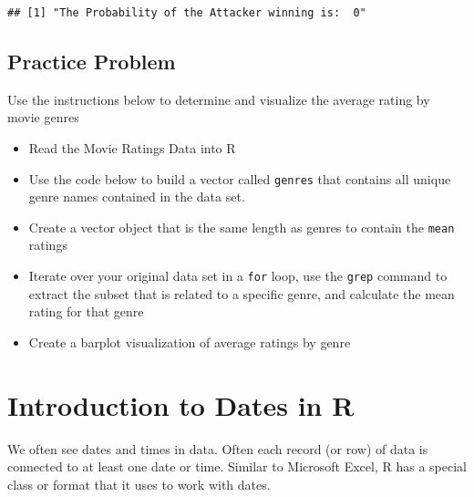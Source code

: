 \documentclass[]{book}
\newenvironment{Shaded}{\begin{snugshade}}{\end{snugshade}}
\newcommand{\KeywordTok}[1]{\textcolor[rgb]{0.13,0.29,0.53}{\textbf{{#1}}}}
\newcommand{\CharTok}[1]{\textcolor[rgb]{0.31,0.60,0.02}{{#1}}}
\newcommand{\StringTok}[1]{\textcolor[rgb]{0.31,0.60,0.02}{{#1}}}
\newcommand{\NormalTok}[1]{{#1}}
\providecommand{\tightlist}{%
  \setlength{\itemsep}{0pt}\setlength{\parskip}{0pt}}
\begin{document}
\begin{verbatim}
## [1] "The Probability of the Attacker winning is:  0"
\end{verbatim}

\section{Practice Problem}\label{practice-problem-3}

Use the instructions below to determine and visualize the average rating
by movie genres

\begin{itemize}
\tightlist
\item
  Read the Movie Ratings Data into R
\item
  Use the code below to build a vector called \texttt{genres} that
  contains all unique genre names contained in the data set.
\end{itemize}

\begin{Shaded}
\end{Shaded}

\begin{itemize}
\tightlist
\item
  Create a vector object that is the same length as genres to contain
  the \texttt{mean} ratings
\item
  Iterate over your original data set in a \texttt{for} loop, use the
  \texttt{grep} command to extract the subset that is related to a
  specific genre, and calculate the mean rating for that genre
\item
  Create a barplot visualization of average ratings by genre
\end{itemize}

\chapter{Introduction to Dates in R}\label{introduction-to-dates-in-r}

We often see dates and times in data. Often each record (or row) of data
is connected to at least one date or time. Similar to Microsoft Excel, R
has a special class or format that it uses to work with dates.
\end{document}
